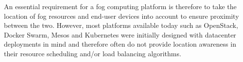 \documentclass[letterpaper,twocolumn,10pt]{article}
\begin{document}


An essential requirement for a fog computing platform is therefore to
take the location of fog resources and end-user devices into account
to ensure proximity between the two. However, most platforms available
today such as OpenStack, Docker Swarm, Mesos and Kubernetes were
initially designed with datacenter deployments in mind and therefore
often do not provide location awareness in their resource scheduling
and/or load balancing algorithms.






\end{document}
